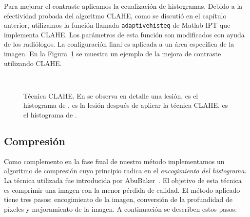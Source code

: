 Para mejorar el contraste aplicamos la ecualización de histogramas. Debido a la
efectividad probada del algoritmo CLAHE, como se discutió en el capítulo
anterior, utilizamos la función llamada \texttt{adaptivehisteq} de Matlab IPT
que implementa CLAHE. Los parámetros de esta función son modificados con ayuda
de los radiólogos. La configuración final es aplicada a un área específica de
la imagen. En la Figura~\ref{img:clahe} se muestra un ejemplo de la mejora de
contraste utilizando CLAHE.

\begin{figure}[h!]
  \begin{center}
    \hspace{12pt}
    \\
    \hspace{12pt}
  \end{center} 

  \caption[Técnica CLAHE]{Técnica CLAHE. En \protect{} se observa
  en detalle una lesión, \protect{} es el histograma de
  \protect{}, \protect{} es la lesión después de
  aplicar la técnica CLAHE, \protect{} es el histograma de
  \protect{}.} 

  \label{img:clahe} 
\end{figure}

\subsection{Compresión}
\label{compression}

Como complemento en la fase final de nuestro método implementamos un algoritmo
de compresión cuyo principio radica en el \textit{encogimiento del histograma}.
La técnica utilizada fue introducida por AbuBaker~\cite{abubaker2006mammogram,
abubaker2007efficient}. El objetivo de esta técnica es comprimir una imagen
con la menor pérdida de calidad. El método aplicado tiene tres pasos:
encogimiento de la imagen, conversión de la profundidad de píxeles y
mejoramiento de la imagen. A continuación se describen estos pasos:

